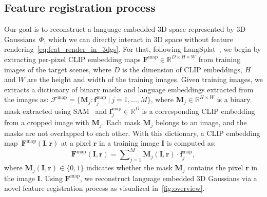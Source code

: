 \subsection{Feature registration process}
\label{subsec:4_1}

Our goal is to reconstruct a language embedded 3D space represented by 3D Gaussians~$\Phi$, which we can directly interact in 3D space without feature rendering~\cref{eq:feat_render_in_3dgs}. For that, following LangSplat~\cite{langsplat}, we begin by extracting per-pixel CLIP embedding maps $\mathbf{F}^\text{map} \in \mathbb{R}^{D\times H \times W}$ from training images of the target scenes, where $D$ is the dimension of CLIP embeddings, $H$ and $W$ are the height and width of the training images. Given training images, we extracts a dictionary of binary masks and language embeddings extracted from the images as: $\mathcal{F}^\text{map} = \{\mathbf{M}_j : \mathbf{f}^\text{map}_j \ |\ j=1,...,M\}$, where $\mathbf{M}_j\in \mathbb{R}^{H \times W}$ is a binary mask extracted using SAM~\cite{sam} and $\mathbf{f}^\text{map}_j \in \mathbb{R}^{D}$ is a corresponding CLIP embedding 
from
a cropped image with $\mathbf{M}_j$.
Each mask $\mathbf{M}_j$ belongs to an image, and the masks are not overlapped to each other. 
With this dictionary, a CLIP embedding map~$\mathbf{F}^\text{map}(\mathbf{I}, \mathbf{r})$ at a pixel $\mathbf{r}$ in a training image $\mathbf{I}$ is computed as:
\begin{equation}
    \mathbf{F}^\text{map}(\mathbf{I}, \mathbf{r}) = \sum\nolimits_{j=1}^M\mathbf{M}_j(\mathbf{I}, \mathbf{r})\cdot\mathbf{f}^\text{map}_j,
\end{equation}
where $\mathbf{M}_j(\mathbf{I}, \mathbf{r}) \in \{0,1\}$ indicates whether the mask $\mathbf{M}_j$ contains the pixel $\mathbf{r}$ in the image $\mathbf{I}$. 
Using $\mathbf{F}^\text{map}$, we reconstruct language embedded 3D Gaussians via a novel feature registration process as visualized in~\cref{fig:overview}. 

